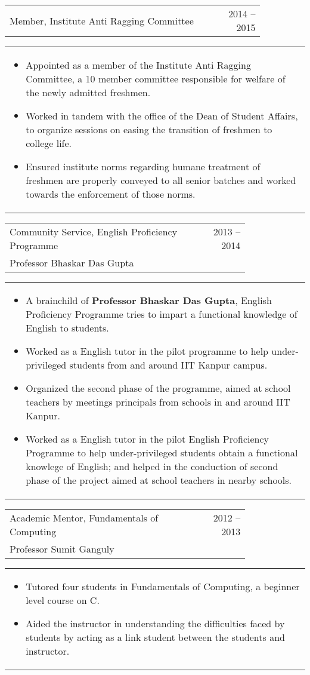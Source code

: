 \documentclass[a4paper,10pt]{article} %
\newcommand{\lproject}[4]{
    \begin{tabular}{p{0.80\linewidth}r}
        \textcolor{NavyBlue}{#2} & \multicolumn{1}{m{4cm}}{\raggedleft \textsc{#1}}\\
        #3
    \end{tabular}
    \begin{tabular}{p{\linewidth}}
    \vspace{-0.3cm}
        \footnotesize{#4}
    \end{tabular}
    \vspace{-0.5cm}
}
\newcommand{\iproject}[3]{
    \begin{tabular}{p{0.85\linewidth}r}
        \textcolor{NavyBlue}{#2} & \multicolumn{1}{m{3cm}}{\raggedleft \textsc{#1}}\\
    \end{tabular}
    \begin{tabular}{p{\linewidth}}
    \vspace{-0.3cm}
        \footnotesize{#3}
    \end{tabular}
    \vspace{-0.5cm}
}
\begin{document}
\iproject {2014 -- 2015}
          {Member, Institute Anti Ragging Committee}
          {
               \begin{itemize}[leftmargin=0.5cm]
                   \item Appointed as a member of the Institute Anti Ragging Committee, a 10 member committee responsible
                       for welfare of the newly admitted freshmen.
                   \item Worked in tandem with the office of the Dean of Student Affairs, to organize sessions
                       on easing the transition of freshmen to college life.
                   \item Ensured institute norms regarding humane treatment of freshmen are properly conveyed to all senior batches
                       and worked towards the enforcement of those norms.
               \end{itemize}
          }

\lproject {2013 -- 2014}
          {Community Service, English Proficiency Programme}
          {Professor Bhaskar Das Gupta}
          {
               \begin{itemize}[leftmargin=0.5cm]
                   \item A brainchild of \textbf{Professor Bhaskar Das Gupta}, English Proficiency Programme tries to impart a functional
                       knowledge of English to students.
                   \item Worked as a English tutor in the pilot programme to help under-privileged students from and around IIT Kanpur campus.
                   \item Organized the second phase of the programme, aimed at school teachers by meetings principals from schools in and
                       around IIT Kanpur.
                   \item Worked as a English tutor in the pilot English Proficiency Programme to help
                       under-privileged students obtain a functional knowlege of English; and helped in the
                       conduction of second phase of the project aimed at school teachers in nearby schools.
               \end{itemize}
          }

\lproject {2012 -- 2013}
          {Academic Mentor, Fundamentals of Computing}
          {Professor Sumit Ganguly}
          {
               \begin{itemize}[leftmargin=0.5cm]
                   \item Tutored four students in Fundamentals of Computing, a beginner level course on C.
                   \item Aided the instructor in understanding the difficulties faced by students by acting as a link
                       student between the students and instructor.
               \end{itemize}
          }
\end{document}
